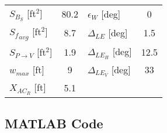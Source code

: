 \documentclass[letterpaper,12pt]{article}
\begin{document}
\begin{center}
\begin{tabular}{lclc}
$S_{B_S}$ [ft$^2$] &\hspace*{-3cm}  80.2& $\epsilon_W$ [deg] & 0\vspace*{0.12cm}\\
${S_f}_{avg}$ [ft$^2$] &\hspace*{-3cm}  8.7& $\Delta_{LE}$ [deg] & 1.5\vspace*{0.12cm}\\
$S_{P\rightarrow V}$ [ft$^2$]&\hspace*{-3cm}  1.9& $\Delta_{LE_H}$ [deg] & 12.5\vspace*{0.12cm}\\
$w_{max}$ [ft]&\hspace*{-3cm}  9& $\Delta_{LE_V}$ [deg] & 33\vspace*{0.12cm}\\
$X_{AC_R}$ [ft]&\hspace*{-3cm}  5.1&  & \vspace*{0.5cm}\\ \hline
\end{tabular}
\end{center}
\newpage
\subsection{MATLAB Code}

\end{document}
